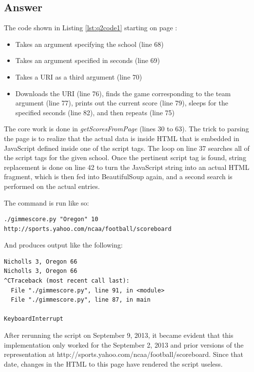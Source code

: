\documentclass[letterpaper,11pt]{article}
\begin{document}
{\newpage
\subsection*{Answer}



\newpage
The code shown in Listing \ref{lst:q2code1} starting on page \pageref{lst:q2code1}:
\begin{itemize}
\item Takes an argument specifying the school (line 68)
\item Takes an argument specified in seconds (line 69)
\item Takes a URI as a third argument (line 70)
\item Downloads the URI (line 76), finds the game corresponding to the team argument (line 77), prints out the current score (line 79), sleeps for the specified seconds (line 82), and then repeats (line 75)
\end{itemize}

The core work is done in \emph{getScoresFromPage} (lines 30 to 63).  The trick to parsing the page is to realize that the actual data is inside HTML that is embedded in JavaScript defined inside one of the script tags.  The loop on line 37 searches all of the script tags for the given school.  Once the pertinent script tag is found, string replacement is done on line 42 to turn the JavaScript string into an actual HTML fragment, which is then fed into BeautifulSoup again, and a second search is performed on the actual entries.

The command is run like so:
\begin{lstlisting}[frame=single]
./gimmescore.py "Oregon" 10 http://sports.yahoo.com/ncaa/football/scoreboard
\end{lstlisting}

And produces output like the following:
\begin{lstlisting}[frame=single]
Nicholls 3, Oregon 66
Nicholls 3, Oregon 66
^CTraceback (most recent call last):
  File "./gimmescore.py", line 91, in <module>
  File "./gimmescore.py", line 87, in main
    
KeyboardInterrupt
\end{lstlisting}

After rerunning the script on September 9, 2013, it became evident that this implementation only worked for the September 2, 2013 and prior versions of the representation at http://sports.yahoo.com/ncaa/football/scoreboard.  Since that date, changes in the HTML to this page have rendered the script useless.

}
\end{document}
